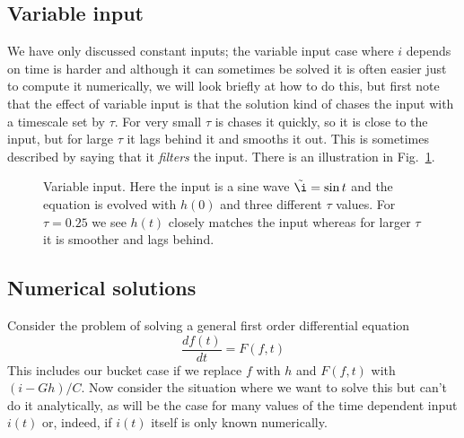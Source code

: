\documentclass[11pt,a4paper]{scrartcl}
\begin{document}
\subsection*{Variable input}

We have only discussed constant inputs; the variable input case where
$i$ depends on time is harder and although it can sometimes be solved
it is often easier just to compute it numerically, we will look
briefly at how to do this, but first note that the effect of variable
input is that the solution kind of chases the input with a timescale
set by $\tau$. For very small $\tau$ is chases it quickly, so it is
close to the input, but for large $\tau$ it lags behind it and smooths
it out. This is sometimes described by saying that it \textsl{filters}
the input. There is an illustration in Fig.~\ref{chasing}.

\begin{figure}
\begin{center}

\end{center}
\caption{Variable input. Here the input is a sine wave $\tilde{\i}=\sin{t}$ and the equation is evolved with $h(0)$ and three different $\tau$ values. For $\tau=0.25$ we see $h(t)$ closely matches the input whereas for larger $\tau$ it is smoother and lags behind.\label{chasing}}
\end{figure}

\subsection*{Numerical solutions}

Consider the problem of solving a general first order differential equation
\begin{equation}
\frac{df(t)}{dt}=F(f,t)
\end{equation}
This includes our bucket case if we replace $f$ with $h$ and $F(f,t)$
with $(i-Gh)/C$. Now consider the situation where we want to solve
this but can't do it analytically, as will be the case for many
values of the time dependent input $i(t)$ or, indeed, if $i(t)$ itself
is only known numerically. 
\end{document}

